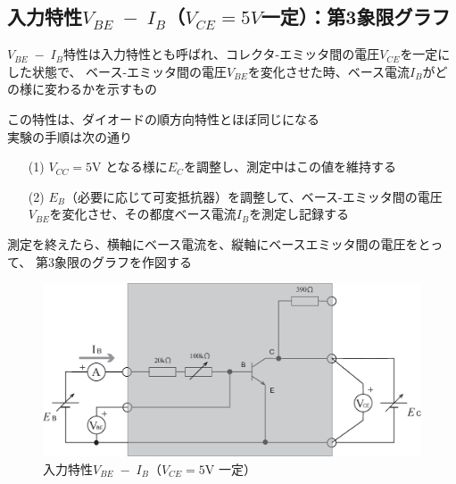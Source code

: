 \documentclass[uplatex,a4paper,11pt,oneside,openany]{jsbook}
\begin{document}
\newpage

\subsection{入力特性$V_{BE}\;-\;I_B$（$V_{CE}=5V$一定）：第3象限グラフ}

$V_{BE}\;-\;I_B$特性は入力特性とも呼ばれ、コレクタ-エミッタ間の電圧$V_{CE}$を一定にした状態で、
ベース-エミッタ間の電圧$V_{BE}$を変化させた時、ベース電流$I_B$がどの様に変わるかを示すもの

この特性は、ダイオードの順方向特性とほぼ同じになる\\

実験の手順は次の通り

\begin{enumerate}
\item[(1)] $V_{CC}=5$V となる様に$E_C$を調整し、測定中はこの値を維持する
\item[(2)] $E_B$（必要に応じて可変抵抗器）を調整して、ベース-エミッタ間の電圧$V_{BE}$を変化させ、その都度ベース電流$I_B$を測定し記録する
\end{enumerate}

測定を終えたら、横軸にベース電流を、縦軸にベースエミッタ間の電圧をとって、
第3象限のグラフを作図する

\vfill

\begin{figure}[H]
  \centering
   \includegraphics[keepaspectratio, scale=0.45, angle=0]
               {figs/eps/ex3.eps}
               \caption{入力特性$V_{BE}\;-\;I_B$（$V_{CE}=5$V 一定）}
               \label{fig:ex3}
\end{figure}

\vfill
\end{document}
